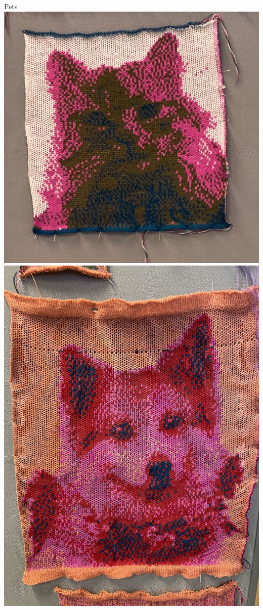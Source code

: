 \documentclass[
    NAME={Dr. Helga Ingimundardóttir},
    EMAIL={helgaingim@hi.is},
    FACULTY={Industrial Engineering},
    TITLE={HiDef Textiles: Reviving Tradition with Innovation},
    SUBTITLE={Empowering Creativity and Sustainability in Textile Production through Digital Transformation},
    SEMINAR={Reykjavík DataBeers},
    DATE={January 25, 2025},
    WIDE={true}
]{HI-LaTeX/hi-beamer}
\begin{document}
\begin{frame}{Pets}
\centering
\includegraphics[height=.7\textheight]{include/kisa.png}
    \hspace{24pt}
    \includegraphics[height=.7\textheight]{include/hundur.jpg}

\end{frame}
\end{document}
